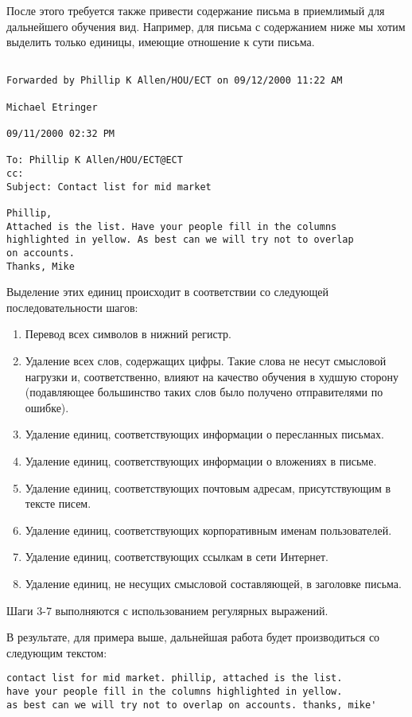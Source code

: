 После этого требуется также привести содержание письма в приемлимый для дальнейшего обучения вид. Например, для письма с содержанием ниже мы хотим выделить только единицы, имеющие отношение к сути письма.

\begin{verbatim}

Forwarded by Phillip K Allen/HOU/ECT on 09/12/2000 11:22 AM 

Michael Etringer

09/11/2000 02:32 PM

To: Phillip K Allen/HOU/ECT@ECT
cc:  
Subject: Contact list for mid market

Phillip,
Attached is the list. Have your people fill in the columns 
highlighted in yellow. As best can we will try not to overlap
on accounts. 
Thanks, Mike
\end{verbatim}

Выделение этих единиц происходит в соответствии со следующей последовательности шагов:
\begin{enumerate}
\item Перевод всех символов в нижний регистр.
\item Удаление всех слов, содержащих цифры. Такие слова не несут смысловой нагрузки и, соответственно, влияют на качество обучения в худшую сторону (подавляющее большинство таких слов было получено отправителями по ошибке).
\item Удаление единиц, соответствующих информации о пересланных письмах.
\item Удаление единиц, соответствующих информации о вложениях в письме.
\item Удаление единиц, соответствующих почтовым адресам, присутствующим в тексте писем.
\item Удаление единиц, соответствующих корпоративным именам пользователей.
\item Удаление единиц, соответствующих ссылкам в сети Интернет.
\item Удаление единиц, не несущих смысловой составляющей, в заголовке письма.
\end{enumerate}

Шаги 3-7 выполняются с использованием регулярных выражений. 

В результате, для примера выше, дальнейшая работа будет производиться со следующим текстом:
\begin{verbatim}
contact list for mid market. phillip, attached is the list. 
have your people fill in the columns highlighted in yellow. 
as best can we will try not to overlap on accounts. thanks, mike'
\end{verbatim}

